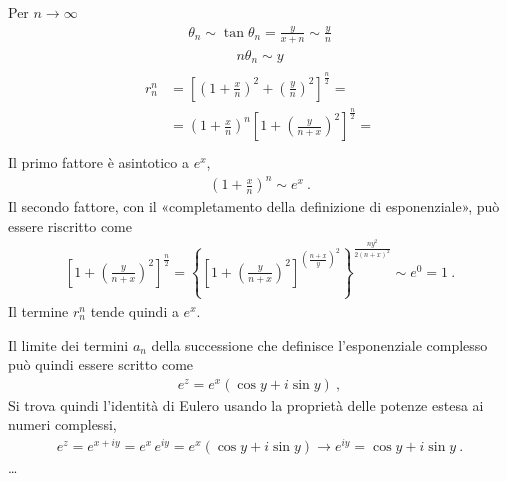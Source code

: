 \documentclass[letterpaper,10pt,italian]{jupyterBook}
\begin{document}
\sphinxAtStartPar
Per \(n \rightarrow \infty\)
\begin{equation*}
\begin{split}\theta_n \sim \tan \theta_n = \frac{y}{x+n} \sim \frac{y}{n}\end{split}
\end{equation*}\begin{equation*}
\begin{split}n \theta_n \sim y\end{split}
\end{equation*}\begin{equation*}
\begin{split}\begin{aligned}
  r_n^n & = \left[ \left( 1 + \frac{x}{n} \right)^2 + \left( \frac{y}{n} \right)^2 \right]^{\frac{n}{2}} = \\
        & = \left( 1 + \frac{x}{n} \right)^{n} \left[ 1 + \left(\frac{y}{n+x}\right)^2 \right]^{\frac{n}{2}} = \\
\end{aligned}\end{split}
\end{equation*}
\sphinxAtStartPar
Il primo fattore è asintotico a \(e^x\),
\begin{equation*}
\begin{split}\left( 1 + \frac{x}{n} \right)^n \sim e^x \ .\end{split}
\end{equation*}
\sphinxAtStartPar
Il secondo fattore, con il «completamento della definizione di esponenziale», può essere riscritto come
\begin{equation*}
\begin{split}\left[ 1 + \left(\frac{y}{n+x}\right)^2 \right]^{\frac{n}{2}} = \left\{ \left[ 1 + \left(\frac{y}{n+x}\right)^2 \right]^{\left(\frac{n+x}{y}\right)^2} \right\}^{\frac{n y^2}{2(n+x)^2}} \sim e^0 = 1 \ .\end{split}
\end{equation*}
\sphinxAtStartPar
Il termine \(r_n^n\) tende quindi a \(e^x\).

\sphinxAtStartPar
Il limite dei termini \(a_n\) della successione che definisce l’esponenziale complesso può quindi essere scritto come
\begin{equation*}
\begin{split}e^z = e^x \left( \cos y + i \sin y \right) \ ,\end{split}
\end{equation*}
\sphinxAtStartPar
Si trova quindi l’identità di Eulero usando la proprietà delle potenze estesa ai numeri complessi,
\begin{equation*}
\begin{split}e^z = e^{x + iy} = e^x \, e^{i y} =  e^x \left( \cos y + i \sin y \right)
\rightarrow
e^{iy} = \cos y + i \sin y \ .
\end{split}
\end{equation*}
\sphinxAtStartPar
{} …
\end{document}
